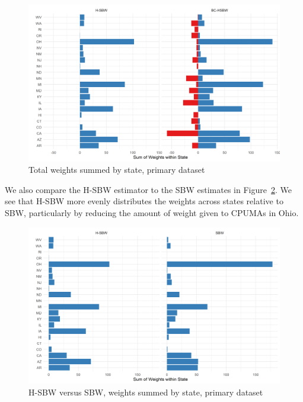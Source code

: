 \begin{figure}[H]
\begin{center}
    \caption{Total weights summed by state, primary dataset}
    \label{fig:statewghts}
    \includegraphics[scale=0.6]{01_Plots/weights-by-state-hsbw-c1.png}
\end{center}
\end{figure}

We also compare the H-SBW estimator to the SBW estimates in Figure~\ref{fig:sbwvhsbw1}. We see that H-SBW more evenly distributes the weights across states relative to SBW, particularly by reducing the amount of weight given to CPUMAs in Ohio. 

\begin{figure}[H]
\begin{center}
    \caption{H-SBW versus SBW, weights summed by state, primary dataset}
    \label{fig:sbwvhsbw1}
    \includegraphics[scale=0.6]{01_Plots/weights-by-state-sbw-hsbw-c1.png}
\end{center}
\end{figure}

